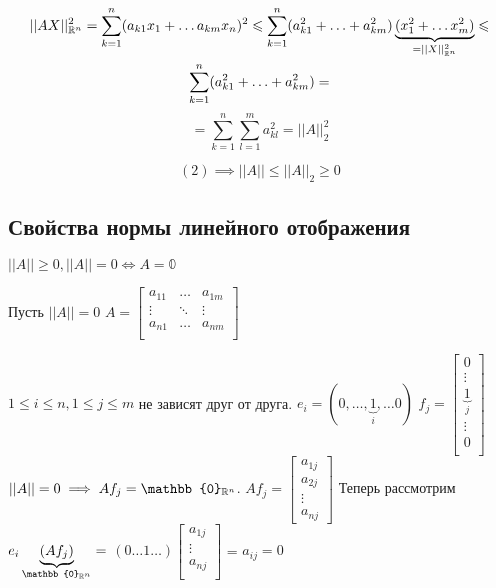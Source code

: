 \documentclass[main]{subfiles}
\begin{document}
\begin{multline*}
    ||AX||^2_{{\mathbb{R}}^n} = \sum_{k=1}^n(a_{k1}x_1 + \ldots a_{km}x_n)^2 \leqslant 
    \sum_{k=1}^n (a^2_{k1} + \ldots + a^2_{km})\underbrace{(x_1^2 + \ldots x_m^2)}_{=||X||^2_{{\mathbb{R}}^n}} \leqslant \\
    \sum_{k=1}^n (a^2_{k1} + \ldots + a^2_{km}) =
\end{multline*}
     \[=\sum_{k=1}^n \sum_{l=1}^m a_{kl}^2 =||A||_2^2  \tag{2}\]


\[(2) \implies ||A|| \leq ||A||_2 \geq 0\]

\subsection{Свойства нормы линейного отображения}
 \begin{theorem}$||A|| \geq 0, ||A|| = 0 \Leftrightarrow A = \mathbb{0}$ \end{theorem}
    \begin{longProof}
        Пусть $||A|| = 0$ 
        $A = \begin{bmatrix}
            a_{11} & \ldots & a_{1m} \\
            \vdots & \ddots & \vdots \\
            a_{n1} & \ldots & a_{nm} \\
        \end{bmatrix}$
        
        $1 \leq i \leq n, 1 \leq j \leq m$ не зависят друг от друга.
        \newline
        $e_i = (0, \ldots, \underbrace{1}_i, \ldots 0)$
        $f_j = \begin{bmatrix}
            0 \\
            \vdots \\
            \underbrace{1}_j \\
            \vdots \\
            0 \\ \end{bmatrix}$
        \newline
        $||A|| = 0 \implies Af_j = \mathbb{0}_{{\vR}^n} $.
        $Af_j =
        \begin{bmatrix}
            a_{1j} \\
            a_{2j}\\
            \vdots \\
            a_{nj}
        \end{bmatrix} $
        Теперь рассмотрим $e_i \underbrace{(Af_j)}_{\mathbb{0}_{{\vR}^n}} =$
        $ (0 \ldots 1 \ldots) \begin{bmatrix}
            a_{1j} \\
            \vdots \\
            a_{nj} \\ \end{bmatrix}$ = $a_{ij} = 0$
    \end{longProof}
\end{document}
